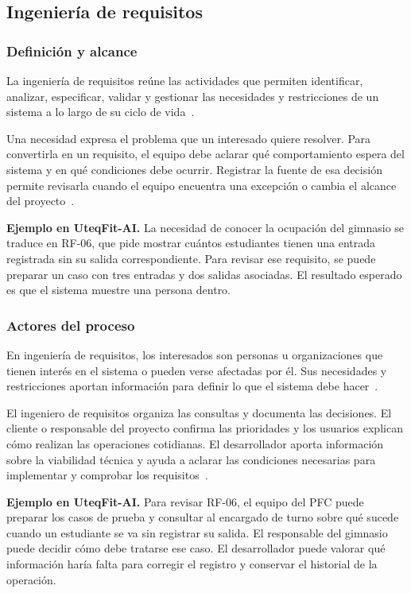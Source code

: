 \subsection{Ingeniería de requisitos}

\subsubsection{Definición y alcance}

La ingeniería de requisitos reúne las actividades que permiten
identificar, analizar, especificar, validar y gestionar las necesidades
y restricciones de un sistema a lo largo de su ciclo de
vida~\cite{ieee29148,pohl2025,swebok2024}.

Una necesidad expresa el problema que un interesado quiere resolver.
Para convertirla en un requisito, el equipo debe aclarar qué
comportamiento espera del sistema y en qué condiciones debe ocurrir.
Registrar la fuente de esa decisión permite revisarla cuando el equipo
encuentra una excepción o cambia el alcance del
proyecto~\cite{ieee29148,pohl2025}.

\textbf{Ejemplo en UteqFit-AI.}
La necesidad de conocer la ocupación del gimnasio se traduce en
RF-06, que pide mostrar cuántos estudiantes tienen una entrada
registrada sin su salida correspondiente. Para revisar ese requisito,
se puede preparar un caso con tres entradas y dos salidas asociadas.
El resultado esperado es que el sistema muestre una persona dentro.

\subsubsection{Actores del proceso}

En ingeniería de requisitos, los interesados son personas u
organizaciones que tienen interés en el sistema o pueden verse
afectadas por él. Sus necesidades y restricciones aportan información
para definir lo que el sistema debe hacer~\cite{ieee29148,pohl2025}.

El ingeniero de requisitos organiza las consultas y documenta las
decisiones. El cliente o responsable del proyecto confirma las
prioridades y los usuarios explican cómo realizan las operaciones
cotidianas. El desarrollador aporta información sobre la viabilidad
técnica y ayuda a aclarar las condiciones necesarias para implementar
y comprobar los requisitos~\cite{pohl2025,swebok2024}.

\textbf{Ejemplo en UteqFit-AI.}
Para revisar RF-06, el equipo del PFC puede preparar los casos de
prueba y consultar al encargado de turno sobre qué sucede cuando
un estudiante se va sin registrar su salida. El responsable del
gimnasio puede decidir cómo debe tratarse ese caso. El desarrollador
puede valorar qué información haría falta para corregir el registro
y conservar el historial de la operación.